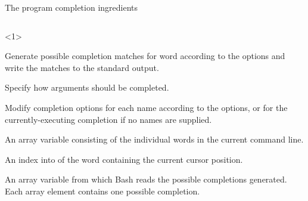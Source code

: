 \begin{frame}{The program completion ingredients}
    \vspace{-4mm}
    \begin{columns}
        \begin{column}{\dimexpr\paperwidth-18mm}
            \begin{onlyenv}<1>
                \begin{description}
                    \setlength{\itemsep}{2mm}
                    \item[\PB{\texttt{compgen}}]
                        Generate possible completion matches for word according to the options and write the matches to the standard output.
                    \item[\PB{\texttt{complete}}]
                        Specify how arguments should be completed.
                    \item[\PB{\texttt{compopt}}]
                        Modify completion options for each name according to the options, or for the currently-executing completion if no names are supplied.\\[6mm]
                    \item[\PB{\texttt{COMP\_WORDS}}]
                        An array variable consisting of the individual words in the current command line.
                    \item[\PB{\texttt{COMP\_CWORD}}]
                        An index into  of the word containing the current cursor position.
                    \item[\PB{\texttt{COMPREPLY}}]
                        An array variable from which Bash reads the possible completions generated. Each array element contains one possible completion.
                \end{description}
            \end{onlyenv}
        \end{column}
    \end{columns}
    \PrepareURLsymbol[PB]
\end{frame}
